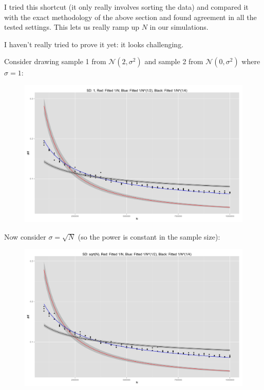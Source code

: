 I tried this shortcut (it only really involves sorting the data) and
compared it with the exact methodology of the above section and found
agreement in all the tested settings.  This lets us really ramp up $N$
in our simulations.

I haven't really tried to prove it yet: it looks challenging.

Consider drawing sample 1 from $\mathcal{N}(2, \sigma^2)$ and sample 2
from $\mathcal{N}(0, \sigma^2)$ where $\sigma = 1$:
\begin{figure}[!ht]
  \centering
  \includegraphics[scale=.06]{./simulations/better_bound_condition/rate_plot_1.png}
\end{figure}

Now consider $\sigma = \sqrt{N}$ (so the power is constant in the
sample size):
\begin{figure}[!ht]
  \centering
  \includegraphics[scale=.06]{./simulations/better_bound_condition/rate_plot_2.png}
\end{figure}

